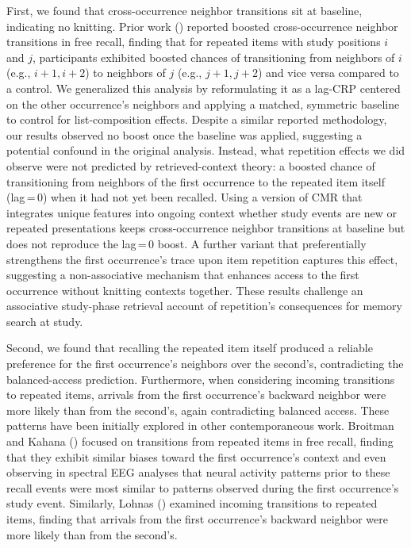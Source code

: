 \documentclass[
  man,
  floatsintext,
  longtable,
  nolmodern,
  notxfonts,
  notimes,
  draftfirst,
  colorlinks=true,linkcolor=blue,citecolor=blue,urlcolor=blue]{apa7}
\begin{document}
First, we found that cross-occurrence neighbor transitions sit at
baseline, indicating no knitting. Prior work
() reported
boosted cross-occurrence neighbor transitions in free recall, finding
that for repeated items with study positions \(i\) and \(j\),
participants exhibited boosted chances of transitioning from neighbors
of \(i\) (e.g., \(i{+}1,i{+}2\)) to neighbors of \(j\) (e.g.,
\(j{+}1,j{+}2\)) and vice versa compared to a control. We generalized
this analysis by reformulating it as a lag-CRP centered on the other
occurrence's neighbors and applying a matched, symmetric baseline to
control for list-composition effects. Despite a similar reported
methodology, our results observed no boost once the baseline was
applied, suggesting a potential confound in the original analysis.
Instead, what repetition effects we did observe were not predicted by
retrieved-context theory: a boosted chance of transitioning from
neighbors of the first occurrence to the repeated item itself
(lag\,=\,0) when it had not yet been recalled. Using a version of CMR
that integrates unique features into ongoing context whether study
events are new or repeated presentations keeps cross-occurrence neighbor
transitions at baseline but does not reproduce the lag\,=\,0 boost. A
further variant that preferentially strengthens the first occurrence's
trace upon item repetition captures this effect, suggesting a
non-associative mechanism that enhances access to the first occurrence
without knitting contexts together. These results challenge an
associative study-phase retrieval account of repetition's consequences
for memory search at study.

Second, we found that recalling the repeated item itself produced a
reliable preference for the first occurrence's neighbors over the
second's, contradicting the balanced-access prediction. Furthermore,
when considering incoming transitions to repeated items, arrivals from
the first occurrence's backward neighbor were more likely than from the
second's, again contradicting balanced access. These patterns have been
initially explored in other contemporaneous work. Broitman and Kahana
() focused on transitions from
repeated items in free recall, finding that they exhibit similar biases
toward the first occurrence's context and even observing in spectral EEG
analyses that neural activity patterns prior to these recall events were
most similar to patterns observed during the first occurrence's study
event. Similarly, Lohnas ()
examined incoming transitions to repeated items, finding that arrivals
from the first occurrence's backward neighbor were more likely than from
the second's.
\end{document}
